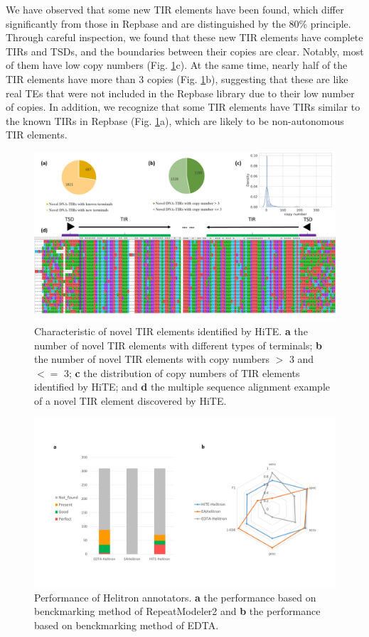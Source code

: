 \documentclass{bmcart}
\begin{document}
We have observed that some new TIR elements have been found, which differ significantly from those in Repbase and are distinguished by the 80\% principle\cite{wicker2007unified}. Through careful inspection, we found that these new TIR elements have complete TIRs and TSDs, and the boundaries between their copies are clear. Notably, most of them have low copy numbers (Fig. \ref{fig:novel_tirs}c). At the same time, nearly half of the TIR elements have more than 3 copies (Fig. \ref{fig:novel_tirs}b), suggesting that these are like real TEs that were not included in the Repbase library due to their low number of copies.
In addition, we recognize that some TIR elements have TIRs similar to the known TIRs in Repbase (Fig. \ref{fig:novel_tirs}a), which are likely to be non-autonomous TIR elements.

\begin{figure}[h!]
	\centerline{\includegraphics[width=1.0\textwidth]{figures/NovelTIRs.pdf}}
	\caption{Characteristic of novel TIR elements identified by HiTE. \textbf{a} the number of novel TIR elements with different types of terminals; \textbf{b} the number of novel TIR elements with copy numbers $>$ 3 and $<=$ 3; \textbf{c} the distribution of copy numbers of TIR elements identified by HiTE; and \textbf{d} the multiple sequence alignment example of a novel TIR element discovered by HiTE.}
	\label{fig:novel_tirs}
\end{figure}

\begin{figure}[h!]
	\centerline{\includegraphics[width=1.0\textwidth]{figures/HelitronResults.pdf}}
	\caption{Performance of Helitron annotators. \textbf{a} the performance based on benckmarking method of RepeatModeler2 and \textbf{b} the performance based on benckmarking method of EDTA.}
	\label{fig:helitron_results}
\end{figure}
\end{document}
